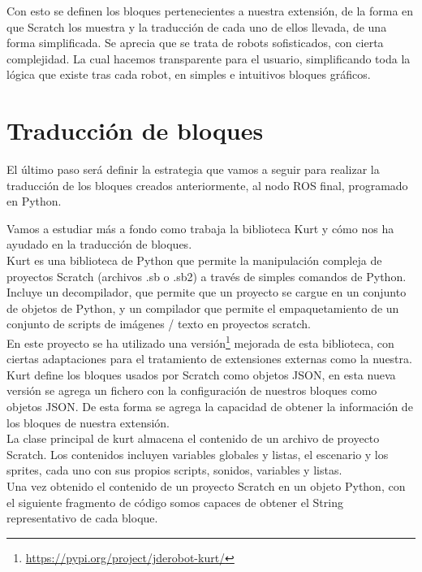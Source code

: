 Con esto se definen los bloques pertenecientes a nuestra extensión, de la forma en que Scratch los muestra y la traducción de cada uno de ellos llevada, de una forma simplificada. Se aprecia que se trata de robots sofisticados, con cierta complejidad. La cual hacemos transparente para el usuario, simplificando toda la lógica que existe tras cada robot, en simples e intuitivos bloques gráficos.

\section{Traducción de bloques}
El último paso será definir la estrategia que vamos a seguir para realizar la traducción de los bloques creados anteriormente, al nodo ROS final, programado en Python.

Vamos a estudiar más a fondo como trabaja la biblioteca Kurt y cómo nos ha ayudado en la traducción de bloques.\\

Kurt es una biblioteca de Python que permite la manipulación compleja de proyectos Scratch (archivos .sb o .sb2) a través de simples comandos de Python. Incluye un decompilador, que permite que un proyecto se cargue en un conjunto de objetos de Python, y un compilador que permite el empaquetamiento de un conjunto de scripts de imágenes / texto en proyectos scratch.\\

En este proyecto se ha utilizado una versión\footnote{\url{https://pypi.org/project/jderobot-kurt/}} mejorada de esta biblioteca, con ciertas adaptaciones para el tratamiento de extensiones externas como la nuestra. Kurt define los bloques usados por Scratch como objetos JSON, en esta nueva versión se agrega un fichero con la configuración de nuestros bloques como objetos JSON. De esta forma se agrega la capacidad de obtener la información de los bloques de nuestra extensión.\\

La clase principal de kurt almacena el contenido de un archivo de proyecto Scratch.
Los contenidos incluyen variables globales y listas, el escenario y los sprites, cada uno con sus propios scripts, sonidos, variables y listas.\\

Una vez obtenido el contenido de un proyecto Scratch en un objeto Python, con el siguiente fragmento de código somos capaces de obtener el String representativo de cada bloque.\\


